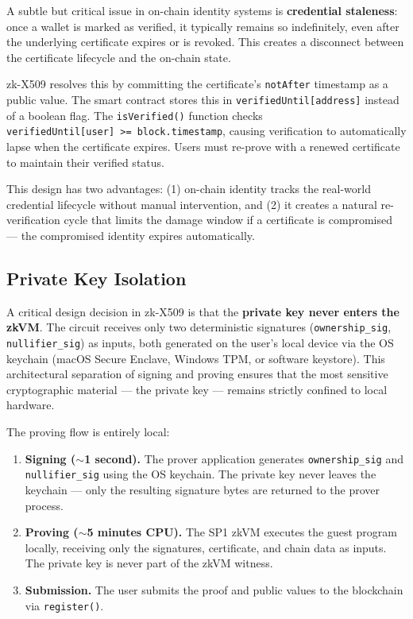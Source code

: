 \documentclass[11pt, a4paper]{article}
\providecommand{\tightlist}{%
  \setlength{\itemsep}{0pt}\setlength{\parskip}{0pt}}
\begin{document}
A subtle but critical issue in on-chain identity systems is
\textbf{credential staleness}: once a wallet is marked as verified, it
typically remains so indefinitely, even after the underlying certificate
expires or is revoked. This creates a disconnect between the certificate
lifecycle and the on-chain state.

zk-X509 resolves this by committing the certificate's \texttt{notAfter}
timestamp as a public value. The smart contract stores this in
\texttt{verifiedUntil{[}address{]}} instead of a boolean flag. The
\texttt{isVerified()} function checks
\texttt{verifiedUntil{[}user{]}\ \textgreater{}=\ block.timestamp},
causing verification to automatically lapse when the certificate
expires. Users must re-prove with a renewed certificate to maintain
their verified status.

This design has two advantages: (1) on-chain identity tracks the
real-world credential lifecycle without manual intervention, and (2) it
creates a natural re-verification cycle that limits the damage window if
a certificate is compromised --- the compromised identity expires
automatically.

\subsection{Private Key Isolation}\label{private-key-isolation}

A critical design decision in zk-X509 is that the \textbf{private key
never enters the zkVM}. The circuit receives only two deterministic
signatures (\texttt{ownership\_sig}, \texttt{nullifier\_sig}) as inputs,
both generated on the user's local device via the OS keychain (macOS
Secure Enclave, Windows TPM, or software keystore). This architectural
separation of signing and proving ensures that the most sensitive
cryptographic material --- the private key --- remains strictly confined
to local hardware.

The proving flow is entirely local:

\begin{enumerate}
\def\labelenumi{\arabic{enumi}.}
\tightlist
\item
  \textbf{Signing ($\sim$1 second).} The prover application
  generates \texttt{ownership\_sig} and \texttt{nullifier\_sig} using
  the OS keychain. The private key never leaves the keychain --- only the resulting signature bytes are returned to the prover process.
\item
  \textbf{Proving ($\sim$5 minutes CPU).} The SP1 zkVM
  executes the guest program locally, receiving only the signatures,
  certificate, and chain data as inputs. The private key is never part
  of the zkVM witness.
\item
  \textbf{Submission.} The user submits the proof and public values to
  the blockchain via \texttt{register()}.
\end{enumerate}
\end{document}
